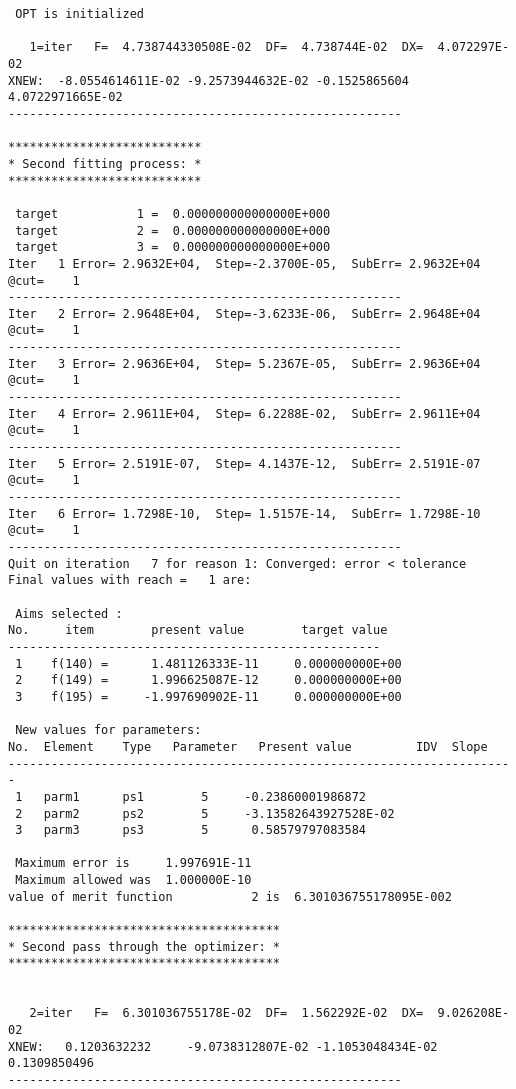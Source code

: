 \begin{footnotesize}
\begin{verbatim}
 OPT is initialized

   1=iter   F=  4.738744330508E-02  DF=  4.738744E-02  DX=  4.072297E-02
XNEW:  -8.0554614611E-02 -9.2573944632E-02 -0.1525865604      4.0722971665E-02
-------------------------------------------------------

***************************
* Second fitting process: *
***************************

 target           1 =  0.000000000000000E+000
 target           2 =  0.000000000000000E+000
 target           3 =  0.000000000000000E+000
Iter   1 Error= 2.9632E+04,  Step=-2.3700E-05,  SubErr= 2.9632E+04 @cut=    1
-------------------------------------------------------
Iter   2 Error= 2.9648E+04,  Step=-3.6233E-06,  SubErr= 2.9648E+04 @cut=    1
-------------------------------------------------------
Iter   3 Error= 2.9636E+04,  Step= 5.2367E-05,  SubErr= 2.9636E+04 @cut=    1
-------------------------------------------------------
Iter   4 Error= 2.9611E+04,  Step= 6.2288E-02,  SubErr= 2.9611E+04 @cut=    1
-------------------------------------------------------
Iter   5 Error= 2.5191E-07,  Step= 4.1437E-12,  SubErr= 2.5191E-07 @cut=    1
-------------------------------------------------------
Iter   6 Error= 1.7298E-10,  Step= 1.5157E-14,  SubErr= 1.7298E-10 @cut=    1
-------------------------------------------------------
Quit on iteration   7 for reason 1: Converged: error < tolerance
Final values with reach =   1 are:

 Aims selected :
No.     item        present value        target value
----------------------------------------------------
 1    f(140) =      1.481126333E-11     0.000000000E+00
 2    f(149) =      1.996625087E-12     0.000000000E+00
 3    f(195) =     -1.997690902E-11     0.000000000E+00

 New values for parameters:
No.  Element    Type   Parameter   Present value         IDV  Slope
-----------------------------------------------------------------------
 1   parm1      ps1        5     -0.23860001986872
 2   parm2      ps2        5     -3.13582643927528E-02
 3   parm3      ps3        5      0.58579797083584

 Maximum error is     1.997691E-11
 Maximum allowed was  1.000000E-10
value of merit function           2 is  6.301036755178095E-002

**************************************
* Second pass through the optimizer: *
**************************************


   2=iter   F=  6.301036755178E-02  DF=  1.562292E-02  DX=  9.026208E-02
XNEW:   0.1203632232     -9.0738312807E-02 -1.1053048434E-02  0.1309850496
-------------------------------------------------------


\end{verbatim}
\end{footnotesize}
